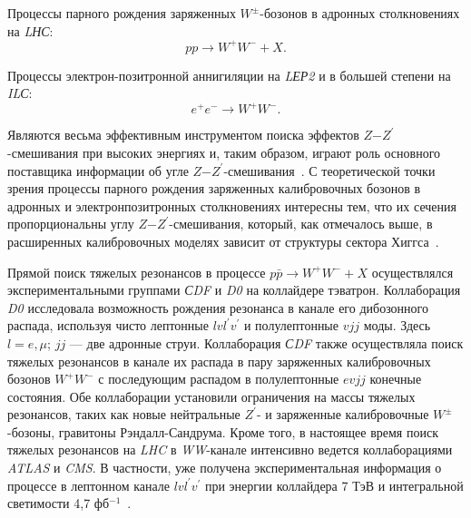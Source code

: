 Процессы парного рождения заряженных $W^±$-бозонов в адронных столкновениях на \textit{LНС}:
\begin{equation} \label{eq:drell3}
	pp \rightarrow W^+W^- + X.
\end{equation}

Процессы электрон-позитронной аннигиляции на \textit{LЕР2} и в большей степени на \textit{ILС}:
\begin{equation} \label{eq:drell4}
	e^+e^- \rightarrow W^+W^-.
\end{equation}

Являются весьма эффективным инструментом поиска эффектов $Z$−$Z^\prime$-смешивания при высоких энергиях и, таким образом, играют роль основного поставщика информации об угле $Z$−$Z^\prime$-смешивания~\cite{Bobovnikov:2016}. С теоретической точки зрения процессы парного рождения заряженных калибровочных бозонов в адронных и электронпозитронных столкновениях интересны тем, что их сечения пропорциональны углу $Z$−$Z^\prime$-смешивания, который, как отмечалось выше, в расширенных калибровочных моделях зависит от структуры сектора Хиггса~\cite{sirunyan:2017}.

Прямой поиск тяжелых резонансов в процессе $p\bar{p} \rightarrow W^+W^- + X$ осуществлялся экспериментальными группами \textit{СDF} и \textit{D0} на коллайдере тэватрон. Коллаборация \textit{D0} исследовала возможность рождения резонанса в канале его дибозонного распада, используя чисто лептонные $lvl^\prime v^\prime$ и полулептонные $vjj$ моды. Здесь $l=e,\mu$; $jj$ — две адронные струи. Коллаборация \textit{СDF} также осуществляла поиск тяжелых резонансов в канале их распада в пару заряженных калибровочных бозонов $W^+W^−$ с последующим распадом в полулептонные $evjj$ конечные состояния. Обе коллаборации установили ограничения на массы тяжелых резонансов, таких как новые нейтральные $Z^\prime$- и заряженные калибровочные $W^±$-бозоны, гравитоны Рэндалл-Сандрума. Кроме того, в настоящее время поиск тяжелых резонансов на \textit{LHC} в \textit{WW}-канале интенсивно ведется коллаборациями \textit{ATLAS} и \textit{CMS}. В частности, уже получена экспериментальная информация о процессе в лептонном канале $lvl^\prime v^\prime$ при энергии коллайдера 7 ТэВ и интегральной светимости 4,7 фб${}^{−1}$~\cite{2part-pankov}.

